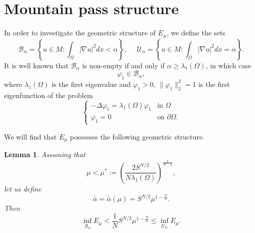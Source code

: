 \documentclass[10pt]{article}
\newcommand{\Bcal}{{\mathcal{B}}}
\newtheorem{lemma}[proposition]{Lemma}
\theoremstyle{definition}
\numberwithin{equation}{section}
\begin{document}
\section{Mountain pass structure}\label{sec:MP}
In order to investigate the geometric structure of $E_{\mu}$, we define the sets
\begin{equation}\label{sets:geo}
\mathcal{B}_{\alpha}=\left\{u\in M : \int_{\Omega}|\nabla u|^{2}dx<\alpha\right\}, \ \ \ \ \ \ \mathcal{U}_{\alpha}=\left\{u\in M : \int_{\Omega}|\nabla u|^{2}dx=\alpha\right\}.
\end{equation}
%
It is well known that $\Bcal_\alpha$ is non-empty if and only if
$\alpha\ge\lambda_{1}(\Omega)$, in which case
\begin{equation}\label{eq:ph1}
\varphi_1 \in \mathcal{B}_{\alpha},
\end{equation}
where $\lambda_{1}(\Omega)$ is the first eigenvalue and $\varphi_{1}>0$,
$\|\varphi_{1}\|_{2}^{2}=1$ is the first eigenfunction of the problem
\begin{equation}\label{eq:ph}
\begin{cases}
-\Delta \varphi_{1} = \lambda_{1}(\Omega) \varphi_{1} & \text{in }\Omega\\
\varphi_1=0 & \text{on }\partial\Omega.
\end{cases}
\end{equation}

We will find that $E_{\mu}$ possesses the following geometric structure.
\begin{lemma}\label{geo-struc}
Assuming that
\begin{equation}\label{eq:cond_baralpha}
\mu<\mu^*:= \left(\dfrac{2S^{N/2}}{N\lambda_{1}(\Omega)}\right)^{\frac{2}{N-2}},
\end{equation}
let us define
\begin{equation}\label{eq:alphabar}
\bar{\alpha}=\bar\alpha(\mu)=S^{N/2}\mu^{1-\frac{N}{2}}.
\end{equation}
Then
\begin{equation}
\inf\limits_{\mathcal{B}_{\bar\alpha}} E_{\mu}<  \frac{1}{N}S^{N/2}\mu^{1-\frac{N}{2}}
\le \inf\limits_{\mathcal{U}_{\bar\alpha}} E_{\mu}.
\end{equation}
\end{lemma}
\end{document}
